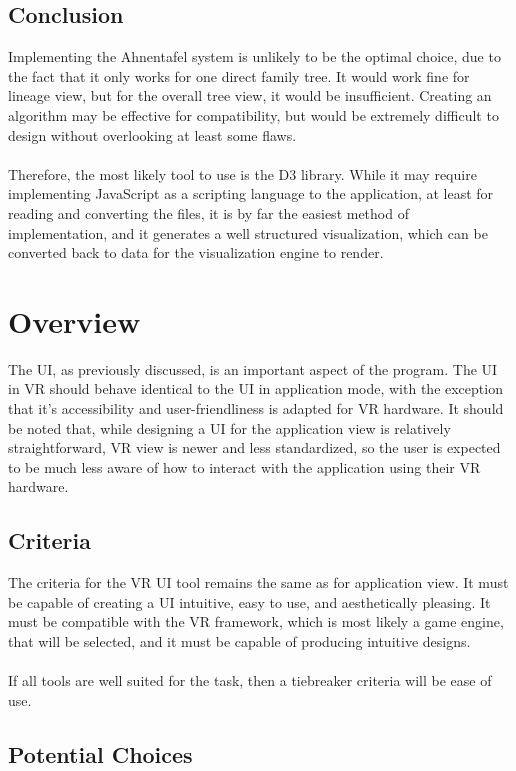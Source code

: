 \documentclass[onecolumn, draftclsnofoot,10pt, compsoc]{IEEEtran}
\begin{document}
\subsection{Conclusion}
Implementing the Ahnentafel system is unlikely to be the optimal choice, due to the fact that it only works for one direct family tree. It would work fine for lineage view, but for the overall tree view, it would be insufficient. Creating an algorithm may be effective for compatibility, but would be extremely difficult to design without overlooking at least some flaws.
\\
\\
Therefore, the most likely tool to use is the D3 library. While it may require implementing JavaScript as a scripting language to the application, at least for reading and converting the files, it is by far the easiest method of implementation, and it generates a well structured visualization, which can be converted back to data for the visualization engine to render.

\section{Overview}
The UI, as previously discussed, is an important aspect of the program. The UI in VR should behave identical to the UI in application mode, with the exception that it's accessibility and user-friendliness is adapted for VR hardware. It should be noted that, while designing a UI for the application view is relatively straightforward, VR view is newer and less standardized, so the user is expected to be much less aware of how to interact with the application using their VR hardware.

\subsection{Criteria}
The criteria for the VR UI tool remains the same as for application view. It must be capable of creating a UI intuitive, easy to use, and aesthetically pleasing. It must be compatible with the VR framework, which is most likely a game engine, that will be selected, and it must be capable of producing intuitive designs.
\\
\\
If all tools are well suited for the task, then a tiebreaker criteria will be ease of use.
\subsection{Potential Choices}
\end{document}
